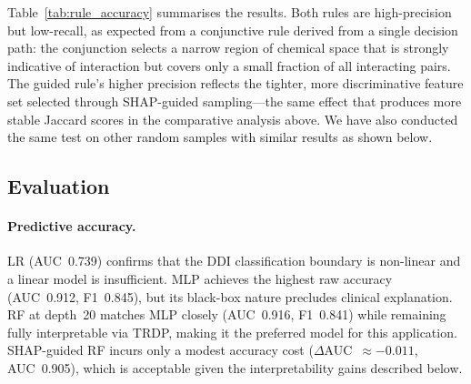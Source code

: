 \documentclass[letterpaper]{article} %
\begin{document}
Table~\ref{tab:rule_accuracy} summarises the results. Both rules are high-precision but low-recall, as expected from a conjunctive rule derived from a single decision path: the conjunction selects a narrow region of chemical space that is strongly indicative of interaction but covers only a small fraction of all interacting pairs. The guided rule's higher precision reflects the tighter, more discriminative feature set selected through SHAP-guided sampling---the same effect that produces more stable Jaccard scores in the comparative analysis above. We have also conducted the same test on other random samples with similar results as shown below.

\begin{table}[h]
\centering
\caption{Top-5-condition TRDP rule applied to the full validation set (6{,}692 samples).}%
\label{tab:rule_accuracy}
\end{table}



\subsection{Evaluation}

\paragraph{Predictive accuracy.}
LR (AUC~0.739) confirms that the DDI classification boundary is non-linear and a linear model is insufficient. MLP achieves the highest raw accuracy (AUC~0.912, F1~0.845), but its black-box nature precludes clinical explanation. RF at depth~20 matches MLP closely (AUC~0.916, F1~0.841) while remaining fully interpretable via TRDP, making it the preferred model for this application. SHAP-guided RF incurs only a modest accuracy cost ($\Delta$AUC~$\approx -0.011$, AUC~0.905), which is acceptable given the interpretability gains described below.
\end{document}
